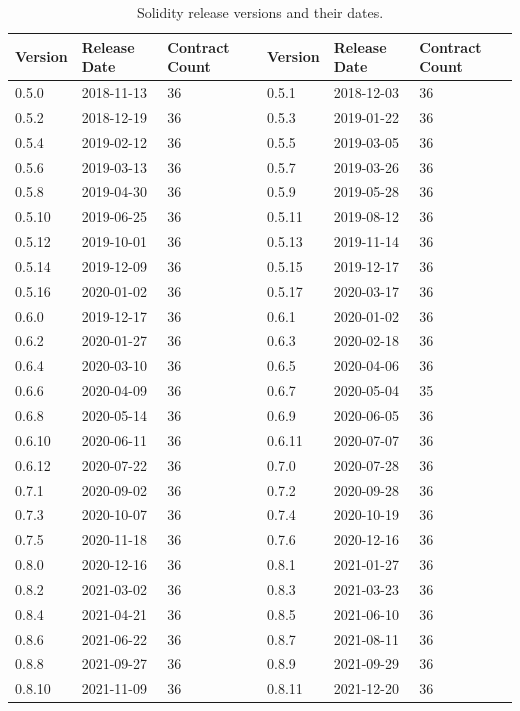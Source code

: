 \documentclass{article}
\begin{document}
	\begin{table}[ht]
		\centering
		  \begin{tabular}{llllll}
			\toprule
			\textbf{Version} & \textbf{Release Date} & \textbf{Contract Count} & \textbf{Version} & \textbf{Release Date} & \textbf{Contract Count} \\
			\midrule
			0.5.0 & 2018-11-13 & 36 & 0.5.1 & 2018-12-03 & 36 \\
			0.5.2 & 2018-12-19 & 36 & 0.5.3 & 2019-01-22 & 36 \\
			0.5.4 & 2019-02-12 & 36 & 0.5.5 & 2019-03-05 & 36 \\
			0.5.6 & 2019-03-13 & 36 & 0.5.7 & 2019-03-26 & 36 \\
			0.5.8 & 2019-04-30 & 36 & 0.5.9 & 2019-05-28 & 36 \\
			0.5.10 & 2019-06-25 & 36 & 0.5.11 & 2019-08-12 & 36 \\
			0.5.12 & 2019-10-01 & 36 & 0.5.13 & 2019-11-14 & 36 \\
			0.5.14 & 2019-12-09 & 36 & 0.5.15 & 2019-12-17 & 36 \\
			0.5.16 & 2020-01-02 & 36 & 0.5.17 & 2020-03-17 & 36 \\
			0.6.0 & 2019-12-17 & 36 & 0.6.1 & 2020-01-02 & 36 \\
			0.6.2 & 2020-01-27 & 36 & 0.6.3 & 2020-02-18 & 36 \\
			0.6.4 & 2020-03-10 & 36 & 0.6.5 & 2020-04-06 & 36 \\
			0.6.6 & 2020-04-09 & 36 & 0.6.7 & 2020-05-04 & 35 \\
			0.6.8 & 2020-05-14 & 36 & 0.6.9 & 2020-06-05 & 36 \\
			0.6.10 & 2020-06-11 & 36 & 0.6.11 & 2020-07-07 & 36 \\
			0.6.12 & 2020-07-22 & 36 & 0.7.0 & 2020-07-28 & 36 \\
			0.7.1 & 2020-09-02 & 36 & 0.7.2 & 2020-09-28 & 36 \\
			0.7.3 & 2020-10-07 & 36 & 0.7.4 & 2020-10-19 & 36 \\
			0.7.5 & 2020-11-18 & 36 & 0.7.6 & 2020-12-16 & 36 \\
			0.8.0 & 2020-12-16 & 36 & 0.8.1 & 2021-01-27 & 36 \\
			0.8.2 & 2021-03-02 & 36 & 0.8.3 & 2021-03-23 & 36 \\
			0.8.4 & 2021-04-21 & 36 & 0.8.5 & 2021-06-10 & 36 \\
			0.8.6 & 2021-06-22 & 36 & 0.8.7 & 2021-08-11 & 36 \\
			0.8.8 & 2021-09-27 & 36 & 0.8.9 & 2021-09-29 & 36 \\
			0.8.10 & 2021-11-09 & 36 & 0.8.11 & 2021-12-20 & 36 \\
			\bottomrule
		\end{tabular}
		\caption{Solidity release versions and their dates.}
		\label{tab:solc-versions}
	\end{table}
\end{document}
